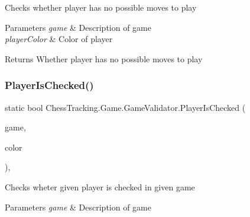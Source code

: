 Checks whether player has no possible moves to play 


\begin{DoxyParams}{Parameters}
{\em game} & Description of game\\
\hline
{\em player\+Color} & Color of player\\
\hline
\end{DoxyParams}
\begin{DoxyReturn}{Returns}
Whether player has no possible moves to play
\end{DoxyReturn}
\mbox{\label{class_chess_tracking_1_1_game_1_1_game_validator_a7de5a5137a4ad56912ec65a693e36883}} 
\subsubsection{\texorpdfstring{PlayerIsChecked()}{PlayerIsChecked()}}
{\footnotesize\ttfamily static bool Chess\+Tracking.\+Game.\+Game\+Validator.\+Player\+Is\+Checked (\begin{DoxyParamCaption}\item[{\mbox{\hyperlink{class_chess_tracking_1_1_game_1_1_game_data}{Game\+Data}}}]{game,  }\item[{\mbox{\hyperlink{namespace_chess_tracking_1_1_game_ab79070a55977a8c8326e9cdda7dcfa9a}{Player\+Color}}}]{color }\end{DoxyParamCaption})\hspace{0.3cm}{\ttfamily [static]}, {\ttfamily [private]}}



Checks wheter given player is checked in given game 


\begin{DoxyParams}{Parameters}
{\em game} & Description of game\\
\hline
\end{DoxyParams}
\mbox{\label{class_chess_tracking_1_1_game_1_1_game_validator_a4c30ee1e2e8ae6afb00f75425b449854}} 
